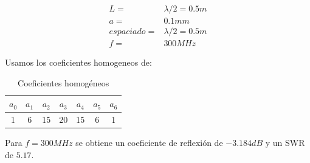\documentclass[11pt]{book}
\begin{document}
\begin{align*}
	L = &\lambda/2 =  0.5m \\
	a = & 0.1mm \\
	espaciado = & \lambda / 2 = 0.5m \\
	f = & 300MHz
\end{align*}

Usamos los coeficientes homogeneos de:
\begin{table}[!ht]
	\centering
	\begin{tabular}{c|c|c|c|c|c|c}
		$a_0$ & $a_1$ & $a_2$ & $a_3$ & $a_4$ & $a_5$ & $a_6$ \\ \hline
		1 & 6 & 15 & 20 & 15 & 6 & 1 \\
	\end{tabular}
	\caption{Coeficientes homogéneos}
	\label{tab:3}
\end{table}

Para $f=300MHz$ se obtiene un coeficiente de reflexión de $-3.184dB$ y un SWR de $5.17$. 
\end{document}
